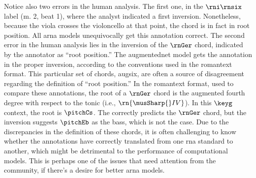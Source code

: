 Notice also two errors in the human analysis. The first one,
in the $\rni\rnsix$ label (m. 2, beat 1), where the analyst
indicated a first inversion. Nonetheless, because the viola
crosses the violoncello at that point, the chord is in fact
in root position. All \gls{arna} models unequivocally get
this annotation correct. The second error in the human
analysis lies in the inversion of the $\rnGer$ chord,
indicated by the annotator as ``root position.'' The
\gls{augmentednet} model gets the annotation in the proper
inversion, according to the conventions used in the
\gls{romantext} format. This particular set of chords,
\gls{augsix}, are often a source of disagreement regarding
the definition of ``root position.'' In the \gls{romantext}
format, used to compare these annotations, the root of a
$\rnGer$ chord is the augmented fourth degree with respect
to the tonic (i.e., $\rn{\musSharp{}IV}$). In this $\keyg$
context, the root is $\pitchCs$. The
\textcite{micchi2021deep} correctly predicts the $\rnGer$
chord, but the inversion suggests $\pitchEb$ as the bass,
which is not the case. Due to the discrepancies in the
definition of these chords, it is often challenging to know
whether the annotations have correctly translated from one
\gls{rna} standard to another, which might be detrimental to
the performance of computational models. This is perhaps one
of the issues that need attention from the community, if
there's a desire for better \gls{arna} models.
